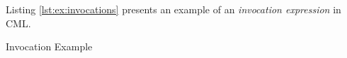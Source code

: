 Listing \ref{lst:ex:invocations} presents an example of
an \emph{invocation expression} in CML.

\begin{code}[H]
\verbatimfont{\small}

\caption{Invocation Example}
\label{lst:ex:invocations}
\end{code}
